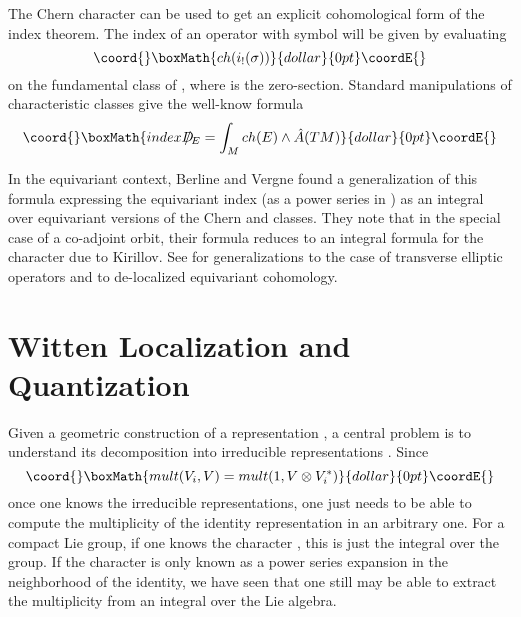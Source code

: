 \documentclass[a4paper,a4paper]{article}
\theoremstyle{conjecture}
\def\Slash#1{#1\!\!\!\!/}
\def\Dirac{\Slash D}
\begin{document}
The Chern character can be used to get an explicit cohomological form of the index theorem.
The index of an operator \coordHE{} with symbol \coordHE{} will be given by evaluating 
$$\coord{}\boxMath{ch(i_!(\sigma))}{dollar}{0pt}\coordE{}$$
on the fundamental class of \coordHE{}, where \coordHE{} is the zero-section.  Standard
manipulations of characteristic classes give the well-know formula 
$$\coord{}\boxMath{index \Dirac _E =\int_M ch(E)\wedge \hat A(TM)}{dollar}{0pt}\coordE{}$$

In the equivariant context, Berline and Vergne \cite{BV0,BGV} found a generalization of this formula  
expressing the equivariant index (as a power series in \coordHE{}) as an integral over equivariant
versions of the Chern and \coordHE{} classes.  They note that in the special case of \coordHE{} a co-adjoint
orbit, their formula reduces to an integral formula for the character due to Kirillov.  See 
\cite{BV1,BV2,Duflo-Vergne} for generalizations to the case of transverse elliptic operators and
to de-localized equivariant cohomology.


\section{Witten Localization and Quantization}
\label{witten-localization}

Given a geometric construction of a representation \coordHE{}, a central problem
is to understand its decomposition into irreducible representations \coordHE{}. 
Since
$$\coord{}\boxMath{mult(V_i,V)=mult(1,V\otimes V_i^*)}{dollar}{0pt}\coordE{}$$
once one knows the irreducible representations, one just needs to be able
to compute the multiplicity of the identity representation in an arbitrary
one.  For a compact Lie group, if one knows the character \coordHE{}, this is
just the integral over the group. If the character is only known as a power
series expansion in the neighborhood of the identity, we have seen that one
still may be able to extract the multiplicity from an integral over the Lie
algebra.
\end{document}
